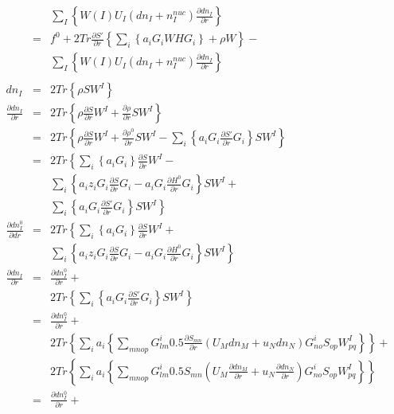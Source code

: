 \documentclass{article}
\begin{document}
\begin{eqnarray*}
&&	\sum_I \left\{ W(I) U_I (dn_I + n^{nuc}_I) \frac{\partial dn_I}{\partial r} \right\} \\
      & = & f^0 + 2 Tr \frac{\partial S'}{\partial r} \left\{  \sum_i \left\{ a_i  G_i W H G_i \right\}   +  \rho W \right\} - \\
&&	\sum_I \left\{ W(I) U_I (dn_I + n^{nuc}_I) \frac{\partial dn_I}{\partial r} \right\} \\
 \\
dn_I & = & 2 Tr \left\{ \rho S W^I \right\} \\
\frac{\partial dn_I}{\partial r} & = & 2 Tr \left\{ \rho \frac{\partial S}{\partial r} W^I + \frac{\partial \rho}{\partial r} S W^I \right\} \\
         & = & 2 Tr \left\{ \rho \frac{\partial S}{\partial r} W^I + \frac{\partial \rho^0}{\partial r} S W^I - \sum_i \left\{ a_i G_i \frac{\partial S'}{\partial r} G_i \right\} S W^I \right\} \\
	 & = & 2 Tr \left\{ \sum_i \left\{ a_i G_i \right\} \frac{\partial S}{\partial r} W^I -  \right. \\
&&		\left. \sum_i \left\{ a_i z_i G_i \frac{\partial S}{\partial r} G_i - a_i G_i \frac{\partial H^0}{\partial r} G_i \right\} S W^I +  \right. \\
&&		\left. \sum_i \left\{ a_i G_i \frac{\partial S'}{\partial r} G_i \right\} S W^I \right\} \\
\frac{\partial dn^0_I}{\partial dr} & = & 2 Tr \left\{ \sum_i \left\{ a_i G_i \right\} \frac{\partial S}{\partial r} W^I + \right. \\
&&		\left. \sum_i \left\{ a_i z_i G_i \frac{\partial S}{\partial r} G_i - a_i G_i \frac{\partial H^0}{\partial r} G_i \right\} S W^I \right\} \\
\frac{\partial dn_I}{\partial r} & = & \frac{\partial dn^0_I}{\partial r} + \\
&&		2 Tr \left\{ \sum_i \left\{ a_i G_i \frac{\partial S'}{\partial r} G_i \right\} S W^I \right\} \\
   & = & \frac{\partial dn^0_I}{\partial r} + \\
&&   2 Tr \left\{ \sum_i a_i \left\{ \sum_{mnop} G^i_{lm} 0.5 \frac{\partial S_{mn}}{\partial r} (U_M dn_M + u_N dn_N) G^i_{no} S_{op} W^I_{pq} \right\} \right\} + \\
&&   2 Tr \left\{ \sum_i a_i \left\{ \sum_{mnop} G^i_{lm} 0.5 S_{mn} ( U_M \frac{\partial dn_M}{\partial r} + u_N \frac{\partial dn_N}{\partial r}) G^i_{no} S_{op} W^I_{pq} \right\} \right\} \\
   & = & \frac{\partial dn^0_I}{\partial r} + \\

\end{eqnarray*}
\end{document}
